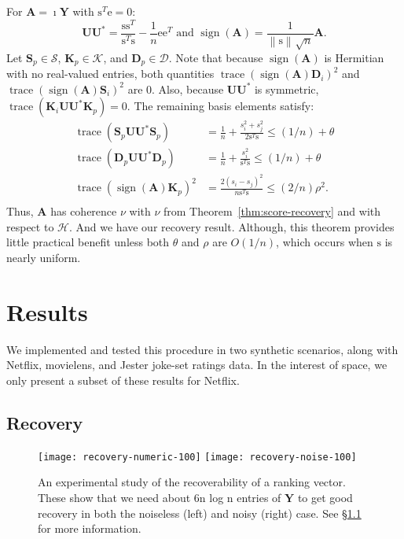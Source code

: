 \documentclass{sig-alternate}
\DeclareMathOperator{\tr}{trace}
\DeclareMathOperator{\sign}{sign}
\newcommand{\mat}{\boldsymbol}
\renewcommand{\vec}[1]{\boldsymbol{\mathrm{#1}}}
\providecommand{\mA}{\ensuremath{\mat{A}}}
\providecommand{\mD}{\ensuremath{\mat{D}}}
\providecommand{\mK}{\ensuremath{\mat{K}}}
\providecommand{\mS}{\ensuremath{\mat{S}}}
\providecommand{\mU}{\ensuremath{\mat{U}}}
\providecommand{\mY}{\ensuremath{\mat{Y}}}
\providecommand{\ve}{\ensuremath{\vec{e}}}
\providecommand{\vs}{\ensuremath{\vec{s}}}
\newcommand{\sstretchsym}[3]{\ensuremath{\left#1 #3 \right#2}}
\newcommand{\normof}[2][]{\sstretchsym{\|}{\|}{#2}_{#1}}
\begin{document}
For $\mA = \imath \mY$ with $\vs^T \ve = 0$:
\[ 
\mU\mU^* = \frac{\vs \vs^T}{\vs^T \vs} - \frac{1}{n} \ve \ve^T \text{ and }
\sign(\mA) = \frac{1}{\normof{\vs}\sqrt{n}} \mA.
\]
Let $\mS_p \in \mathcal{S}$, $\mK_p \in \mathcal{K}$, and 
$\mD_p \in \mathcal{D}$.  Note that 
because $\sign(\mA)$ is Hermitian with no real-valued
entries, both
quantities $\tr(\sign(\mA) \mD_i)^2 $ and
$\tr(\sign(\mA) \mS_i)^2 $ are $0$.
Also, because $\mU \mU^*$ is symmetric, 
$\tr(\mK_i \mU \mU^* \mK_p) = 0$.
The remaining
basis elements satisfy:
\[ 
\begin{aligned}
\tr(\mS_p \mU \mU^* \mS_p) & = \frac{1}{n} + \frac{s_i^2 + s_j^2}{2 \vs^T \vs} 
	\le (1/n) + \theta\\
\tr(\mD_p \mU \mU^* \mD_p) & = \frac{1}{n} + \frac{s_i^2}{\vs^T \vs} 
	\le (1/n) + \theta\\	
\tr(\sign(\mA) \mK_p)^2 &= \frac{2(s_i - s_j)^2}{n \vs^T \vs} \le (2/n)\rho^2.\\
\end{aligned}
\]
Thus, $\mA$ has coherence $\nu$
with $\nu$ from Theorem~\ref{thm:score-recovery}
and with respect to $\mathcal{H}$.  And we have 
our recovery result.  Although, 
this theorem provides little practical benefit unless
both $\theta$ and $\rho$ are $O(1/n)$,
which occurs when $\vs$ is nearly uniform.  


\section{Results} \label{sec:results}
We implemented and tested this procedure in two synthetic
scenarios, along with Netflix, movielens, and Jester
joke-set ratings data.  In the interest of space, we only present
a subset of these results for Netflix.

\subsection{Recovery} \label{sec:recovery}

\begin{figure}
\texttt{[image: recovery-numeric-100]}
\texttt{[image: recovery-noise-100]}
\caption{An experimental study of the recoverability
of a ranking vector.  These show that we need
about 6n log n entries of $\mY$ to get good recovery
in both the noiseless (left) and noisy (right) case.
See \S\ref{sec:recovery} for more information.}
\label{fig:recovery}
\end{figure}
\end{document}
